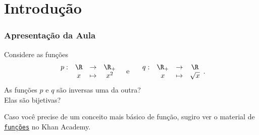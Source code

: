 \section{Introdução}

\begin{frame}  \frametitle{Apresentação da Aula}

Considere as funções
$$\begin{array}{cccc}
p : & \R & \to     & \R_+ \\
		 &  x & \mapsto & x^2
\end{array}
\text{\ \ \  e \ \ \ }
\begin{array}{cccc}
q : & \R_+ & \to     & \R \\
		 &  x & \mapsto & \sqrt x
\end{array}.$$
As funções $p$ e $q$ são inversas uma da outra? \\ \pause Elas são
bijetivas? \\ \pause

Caso você precise de um conceito mais básico de função, sugiro ver o
material de
\href{https://pt.khanacademy.org/math/algebra/algebra-functions}
{{\tt funções}} no Khan Academy.


\end{frame}
